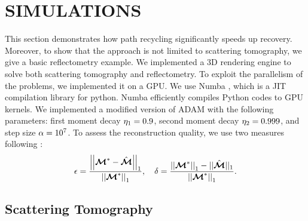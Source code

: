 \documentclass{article}
\begin{document}


\section{SIMULATIONS}
\label{sec:simulations}
This section demonstrates how path recycling significantly speeds up recovery. Moreover, to show that the approach is not limited to scattering tomography, we give a basic reflectometry example. We implemented a 3D rendering engine to solve both scattering tomography and reflectometry. To exploit the parallelism of the problems, we implemented it on a \ac{GPU}. We use Numba \citep{lam2015numba}, which is a \ac{JIT} compilation library for python. Numba efficiently compiles Python codes to \ac{GPU} kernels. We implemented a modified version of \ac{ADAM} \citep{kingma2014adam} with the following parameters: first moment decay $\eta_1=0.9$, second moment decay $\eta_2=0.999$, and step size $\alpha=10^7$.
To assess the reconstruction quality, we use two measures following \citep{loeub2020monotonicity}:
\begin{equation}
\epsilon = \frac{\left|\left| {\boldsymbol{\mathcal{M}}^*-\Hat{\boldsymbol{\mathcal{M}}}} \right|\right|_1}{{\left|\left| {\boldsymbol{\mathcal{M}}^*} \right|\right|_1}},\quad
\delta = \frac{\left|\left| {\boldsymbol{\mathcal{M}}^*} \right|\right|_1-||\Hat{\boldsymbol{\mathcal{M}}}||_1}{{\left|\left| {\boldsymbol{\mathcal{M}}^*} \right|\right|_1}} .
\end{equation}
\subsection{Scattering Tomography}

\end{document}
